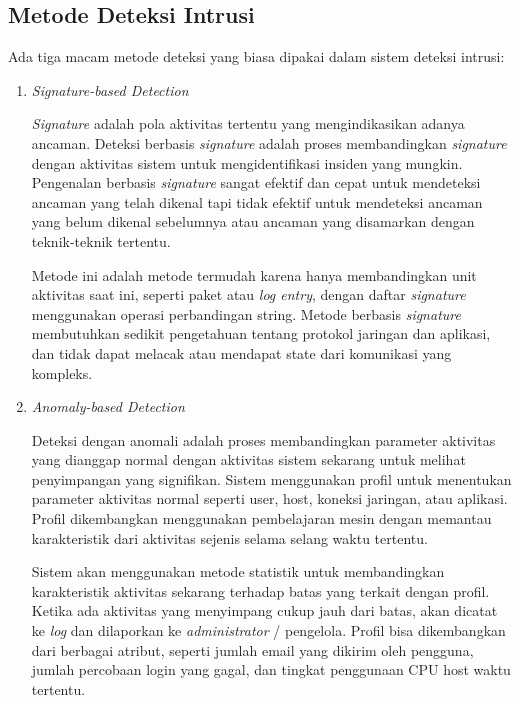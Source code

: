   \subsection{Metode Deteksi Intrusi}

    Ada tiga macam metode deteksi yang biasa dipakai dalam sistem deteksi intrusi:

    \begin{enumerate}

      \item
      \emph{Signature-based Detection}

      \emph{Signature} adalah pola aktivitas tertentu yang mengindikasikan adanya ancaman. Deteksi berbasis \emph{signature} adalah proses membandingkan \emph{signature} dengan aktivitas sistem untuk mengidentifikasi insiden yang mungkin. Pengenalan berbasis \emph{signature} sangat efektif dan cepat untuk mendeteksi ancaman yang telah dikenal tapi tidak efektif untuk mendeteksi ancaman yang belum dikenal sebelumnya atau ancaman yang disamarkan dengan teknik-teknik tertentu.

      Metode ini adalah metode termudah karena hanya membandingkan unit aktivitas saat ini, seperti paket atau \emph{log entry}, dengan daftar \emph{signature} menggunakan operasi perbandingan string. Metode berbasis \emph{signature} membutuhkan sedikit pengetahuan tentang protokol jaringan dan aplikasi, dan tidak dapat melacak atau mendapat state dari komunikasi yang kompleks.

      \item
      \emph{Anomaly-based Detection}

      Deteksi dengan anomali adalah proses membandingkan parameter aktivitas yang dianggap normal dengan aktivitas sistem sekarang untuk melihat penyimpangan yang signifikan. Sistem menggunakan profil untuk menentukan parameter aktivitas normal seperti user, host, koneksi jaringan, atau aplikasi. Profil dikembangkan menggunakan pembelajaran mesin dengan memantau karakteristik dari aktivitas sejenis selama selang waktu tertentu.

      Sistem akan menggunakan metode statistik untuk membandingkan karakteristik aktivitas sekarang terhadap batas yang terkait dengan profil. Ketika ada aktivitas yang menyimpang cukup jauh dari batas, akan dicatat ke \emph{log} dan dilaporkan ke \emph{administrator} / pengelola. Profil bisa dikembangkan dari berbagai atribut, seperti jumlah email yang dikirim oleh pengguna, jumlah percobaan login yang gagal, dan tingkat penggunaan CPU host waktu tertentu.


\end{enumerate}
